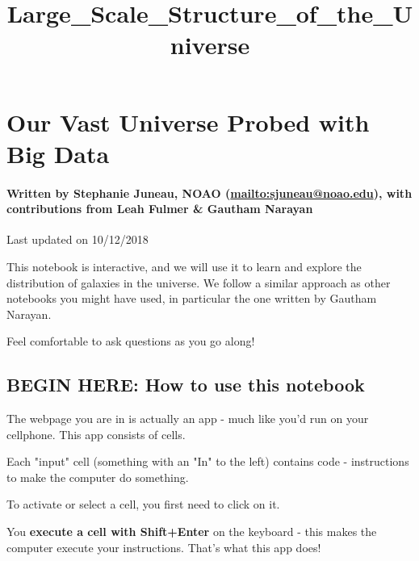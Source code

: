 \documentclass[11pt]{article}
\title{Large\_Scale\_Structure\_of\_the\_Universe}
\begin{document}
    
    
    \maketitle
    
    

    
    \section{\texorpdfstring{\textbf{Our Vast Universe Probed with Big
Data}}{Our Vast Universe Probed with Big Data}}\label{our-vast-universe-probed-with-big-data}

\paragraph{\texorpdfstring{Written by Stephanie Juneau, NOAO
(\url{mailto:sjuneau@noao.edu}), with contributions from Leah Fulmer \&
Gautham
Narayan}{Written by Stephanie Juneau, NOAO (mailto:sjuneau@noao.edu), with contributions from Leah Fulmer \& Gautham Narayan}}\label{written-by-stephanie-juneau-noao-mailtosjuneaunoao.edu-with-contributions-from-leah-fulmer-gautham-narayan}

Last updated on 10/12/2018

 This notebook is interactive, and we will use it to learn and explore
the distribution of galaxies in the universe. We follow a similar
approach as other notebooks you might have used, in particular the one
written by Gautham Narayan.

Feel comfortable to ask questions as you go along!

    \subsection{BEGIN HERE: How to use this
notebook}\label{begin-here-how-to-use-this-notebook}

The webpage you are in is actually an app - much like you'd run on your
cellphone. This app consists of cells.

Each "input" cell (something with an "In" to the left) contains code -
instructions to make the computer do something.

To activate or select a cell, you first need to click on it.

You \textbf{execute a cell with Shift+Enter} on the keyboard - this
makes the computer execute your instructions. That's what this app does!
\end{document}
